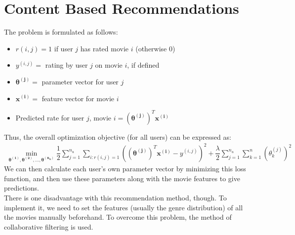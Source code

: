 \documentclass[a4paper, 12pt]{report}
\begin{document}
\section{Content Based Recommendations}
The problem is formulated as follows:
\begin{itemize}
\item[] $r\left(i,j\right) = 1$ if user $j$ has rated movie $i$ (otherwise 0)
\item[] $y^{\left(i,j\right)} =$ rating by user $j$ on movie $i$, if defined
\item[] $\bm{\theta^{\left(j\right)}} =$ parameter vector for user $j$
\item[] $\bm{x^{\left(i\right)}} =$ feature vector for movie $i$
\item[] Predicted rate for user $j$, movie $i = \left(\bm{\theta^{\left(j\right)}}\right)^T\bm{x^{\left(i\right)}}$
\end{itemize}
Thus, the overall optimization objective (for all users) can be expressed as:
\begin{align*}
\min_{\bm{\theta^{\left(1\right)}}, \bm{\theta^{\left(2\right)}}, \dots, \bm{\theta^{\left(n_u\right)}}}\dfrac{1}{2}\sum_{j=1}^{n_u}\sum_{i:r(i,j)=1}\left(\left(\bm{\theta^{\left(j\right)}}\right)^T\bm{x^{\left(i\right)}} - y^{\left(i,j\right)}\right)^2 + \dfrac{\lambda}{2}\sum_{j=1}^{n_u}\sum_{k=1}^{n}\left(\theta_k^{(j)}\right)^2
\end{align*}
We can then calculate each user's own parameter vector by minimizing this loss function, and then use these parameters along with the movie features to give predictions. \\
\break
There is one disadvantage with this recommendation method, though. To implement it, we need to set the features (usually the genre distribution) of all the movies manually beforehand. To overcome this problem, the method of collaborative filtering is used.
\end{document}
